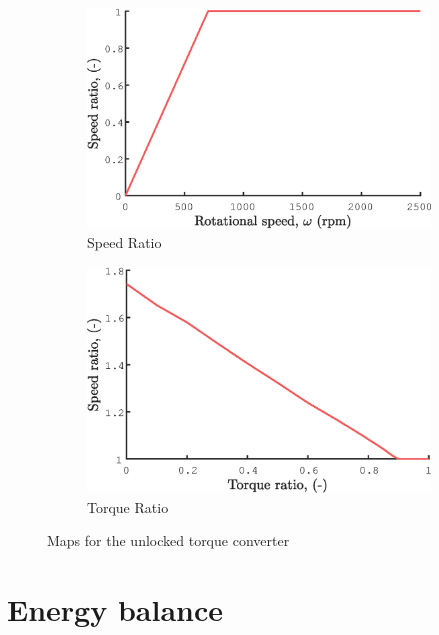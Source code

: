 \begin{figure}[ht]
  \centering
  \begin{subfigure}[b]{0.49\textwidth}
    \includegraphics[width=\textwidth]{figures/model/SR.eps}
    \caption{Speed Ratio}
    \label{fig:SR}
  \end{subfigure}
  \begin{subfigure}[b]{0.49\textwidth}
    \includegraphics[width=\textwidth]{figures/model/TR.eps}
    \caption{Torque Ratio}
    \label{fig:TR}
  \end{subfigure}
  \caption{Maps for the unlocked torque converter}\label{fig:SR_TR}
\end{figure}


\section{Energy balance}
\label{sec:energy_balance}

